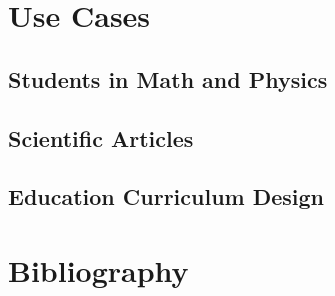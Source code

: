 \documentclass{article}
\begin{document}
\begin{multicols}{2}
\section{Use Cases}

\subsection{Students in Math and Physics}

\subsection{Scientific Articles}

\subsection{Education Curriculum Design}

\section{Bibliography}


\end{multicols}

\newpage
\appendix
%
\end{document}
